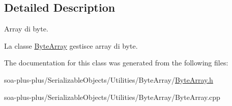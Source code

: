 \subsection{Detailed Description}
Array di byte. 

La classe \hyperlink{class_byte_array}{ByteArray} gestisce array di byte. 

The documentation for this class was generated from the following files:\begin{DoxyCompactItemize}
\item 
soa-\/plus-\/plus/SerializableObjects/Utilities/ByteArray/\hyperlink{_byte_array_8h}{ByteArray.h}\item 
soa-\/plus-\/plus/SerializableObjects/Utilities/ByteArray/ByteArray.cpp\end{DoxyCompactItemize}
